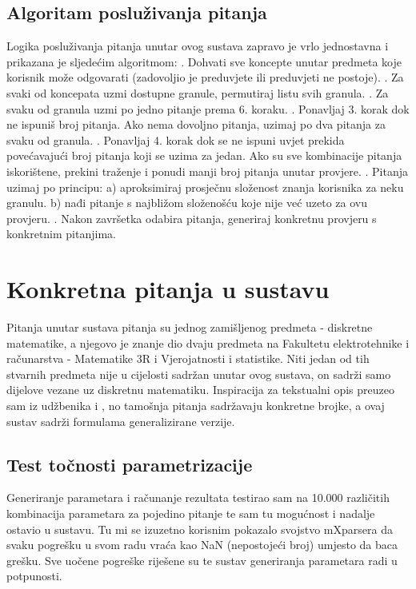 \documentclass[times, utf8, zavrsni, numeric]{fer}
\begin{document}
\subsection{Algoritam posluživanja pitanja}
Logika posluživanja pitanja unutar ovog sustava zapravo je vrlo jednostavna i prikazana je sljedećim algoritmom:
. Dohvati sve koncepte unutar predmeta koje korisnik može odgovarati (zadovoljio je preduvjete ili preduvjeti ne postoje).
. Za svaki od koncepata uzmi dostupne granule, permutiraj listu svih granula.
. Za svaku od granula uzmi po jedno pitanje prema 6. koraku.
. Ponavljaj 3. korak dok ne ispuniš broj pitanja. Ako nema dovoljno pitanja, uzimaj po dva pitanja za svaku od granula.
. Ponavljaj 4. korak dok se ne ispuni uvjet prekida povećavajući broj pitanja koji se uzima za jedan. Ako su sve kombinacije pitanja iskorištene, prekini traženje i ponudi manji broj pitanja unutar provjere.
. Pitanja uzimaj po principu:
\newline
a) aproksimiraj prosječnu složenost znanja korisnika za neku granulu.
\newline
b) nađi pitanje s najbližom složenošću koje nije već uzeto za  ovu provjeru.
. Nakon završetka odabira pitanja, generiraj konkretnu provjeru s konkretnim pitanjima.

\section{Konkretna pitanja u sustavu}
Pitanja unutar sustava pitanja su jednog zamišljenog predmeta - diskretne matematike, a njegovo je znanje dio dvaju predmeta na Fakultetu elektrotehnike i računarstva - Matematike 3R i Vjerojatnosti i statistike. Niti jedan od tih stvarnih predmeta nije u cijelosti sadržan unutar ovog sustava, on sadrži samo dijelove vezane uz diskretnu matematiku. Inspiracija za tekstualni opis preuzeo sam iz udžbenika \citep{zubrinic} i \citep{elezovic}, no tamošnja pitanja sadržavaju konkretne brojke, a ovaj sustav sadrži formulama generalizirane verzije.

\subsection{Test točnosti parametrizacije}
Generiranje parametara i računanje rezultata testirao sam na 10.000 različitih kombinacija parametara za pojedino pitanje te sam tu mogućnost i nadalje ostavio u sustavu. Tu mi se izuzetno korisnim pokazalo svojstvo mXparsera da svaku pogrešku u svom radu vraća kao NaN (nepostojeći broj) umjesto da baca grešku. Sve uočene pogreške riješene su te sustav generiranja parametara radi u potpunosti.
\end{document}
